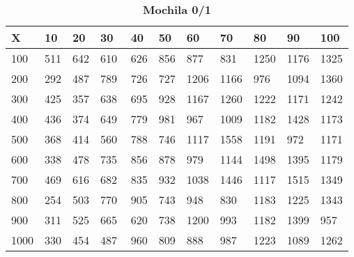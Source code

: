 \documentclass[10pt,letterpaper]{article}
\begin{document}
\newpage 
{}
\begin{center}
\begin{table}\renewcommand{\arraystretch}{2.5}
\caption{\large \textbf{Mochila 0/1}}
\centering
\begin{tabular} { |m{0.5cm}|m{1.3cm}|m{1.3cm}|m{1.3cm}|m{1.3cm}|m{1.3cm}|m{1.3cm}|m{1.3cm}|m{1.3cm}|m{1.3cm}|m{1.3cm}|} 
\hline
\rowcolor{Gray}
\centering \textbf{X} & \centering \textbf{10} & \centering \textbf{20} & \centering \textbf{30}\ & \centering \textbf{40} & \centering \textbf{50} & \centering \textbf{60}\ & \centering \textbf{70} & \centering \textbf{80} & \centering \textbf{90}\ & \textbf{100} \\\hline
\cellcolor{Gray}100 & \Large 511 & \Large 642 & \Large 610 & \Large 626 & \Large 856 & \Large 877 & \Large 831 & \Large 1250 & \Large 1176 & \Large 1325 \\
\hline
\cellcolor{Gray}200 & \Large 292 & \Large 487 & \Large 789 & \Large 726 & \Large 727 & \Large 1206 & \Large 1166 & \Large 976 & \Large 1094 & \Large 1360 \\
\hline
\cellcolor{Gray}300 & \Large 425 & \Large 357 & \Large 638 & \Large 695 & \Large 928 & \Large 1167 & \Large 1260 & \Large 1222 & \Large 1171 & \Large 1242 \\
\hline
\cellcolor{Gray}400 & \Large 436 & \Large 374 & \Large 649 & \Large 779 & \Large 981 & \Large 967 & \Large 1009 & \Large 1182 & \Large 1428 & \Large 1173 \\
\hline
\cellcolor{Gray}500 & \Large 368 & \Large 414 & \Large 560 & \Large 788 & \Large 746 & \Large 1117 & \Large 1558 & \Large 1191 & \Large 972 & \Large 1171 \\
\hline
\cellcolor{Gray}600 & \Large 338 & \Large 478 & \Large 735 & \Large 856 & \Large 878 & \Large 979 & \Large 1144 & \Large 1498 & \Large 1395 & \Large 1179 \\
\hline
\cellcolor{Gray}700 & \Large 469 & \Large 616 & \Large 682 & \Large 835 & \Large 932 & \Large 1038 & \Large 1446 & \Large 1117 & \Large 1515 & \Large 1349 \\
\hline
\cellcolor{Gray}800 & \Large 254 & \Large 503 & \Large 770 & \Large 905 & \Large 743 & \Large 948 & \Large 830 & \Large 1183 & \Large 1225 & \Large 1343 \\
\hline
\cellcolor{Gray}900 & \Large 311 & \Large 525 & \Large 665 & \Large 620 & \Large 738 & \Large 1200 & \Large 993 & \Large 1182 & \Large 1399 & \Large 957 \\
\hline
\cellcolor{Gray}1000 & \Large 330 & \Large 454 & \Large 487 & \Large 960 & \Large 809 & \Large 888 & \Large 987 & \Large 1223 & \Large 1089 & \Large 1262 \\
\hline
\end{tabular} \\
\end{table}
\end{center}
\end{document}
